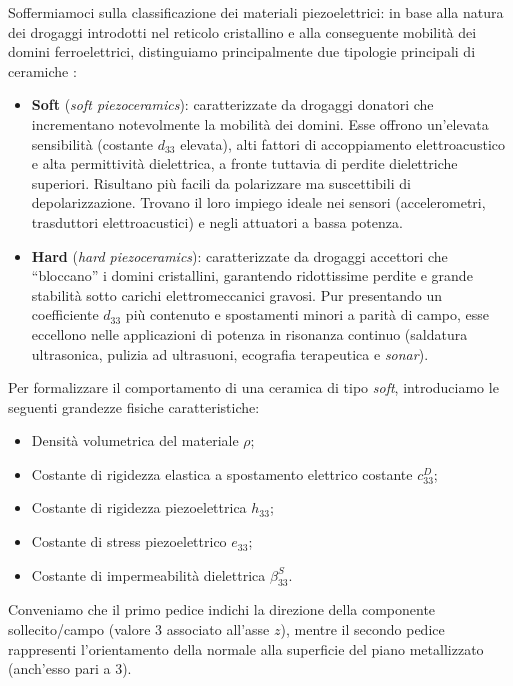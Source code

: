 Soffermiamoci sulla classificazione dei materiali piezoelettrici: in base alla natura dei drogaggi introdotti nel reticolo cristallino e alla conseguente mobilità dei domini ferroelettrici, distinguiamo principalmente due tipologie principali di ceramiche \cite{americanpiezo, ferroperm}:
\begin{itemize}
    \item \textbf{Soft} (\textit{soft piezoceramics}): caratterizzate da drogaggi donatori che incrementano notevolmente la mobilità dei domini. Esse offrono un'elevata sensibilità (costante $d_{33}$ elevata), alti fattori di accoppiamento elettroacustico e alta permittività dielettrica, a fronte tuttavia di perdite dielettriche superiori. Risultano più facili da polarizzare ma suscettibili di depolarizzazione. Trovano il loro impiego ideale nei sensori (accelerometri, trasduttori elettroacustici) e negli attuatori a bassa potenza.
    \item \textbf{Hard} (\textit{hard piezoceramics}): caratterizzate da drogaggi accettori che ``bloccano'' i domini cristallini, garantendo ridottissime perdite e grande stabilità sotto carichi elettromeccanici gravosi. Pur presentando un coefficiente $d_{33}$ più contenuto e spostamenti minori a parità di campo, esse eccellono nelle applicazioni di potenza in risonanza continuo (saldatura ultrasonica, pulizia ad ultrasuoni, ecografia terapeutica e \textit{sonar}).
\end{itemize}

Per formalizzare il comportamento di una ceramica di tipo \textit{soft}, introduciamo le seguenti grandezze fisiche caratteristiche:
\begin{itemize}
    \item Densità volumetrica del materiale $\rho$;
    \item Costante di rigidezza elastica a spostamento elettrico costante $c_{33}^D$;
    \item Costante di rigidezza piezoelettrica $h_{33}$;
    \item Costante di stress piezoelettrico $e_{33}$;
    \item Costante di impermeabilità dielettrica $\beta_{33}^S$.
\end{itemize}

Conveniamo che il primo pedice indichi la direzione della componente sollecito/campo (valore 3 associato all'asse $z$), mentre il secondo pedice rappresenti l'orientamento della normale alla superficie del piano metallizzato (anch'esso pari a 3).

